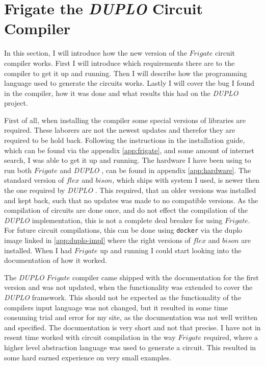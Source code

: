 \documentclass[twoside,11pt,openright]{report}
\newcommand{\DUPLO}{\textit{DUPLO} }
\begin{document}
\section{Frigate the \DUPLO Circuit Compiler}
\label{sec:frigate}
In this section, I will introduce how the new version of the $Frigate$ circuit compiler works. First I will introduce which requirements there are to the compiler to get it up and running. Then I will describe how the programming language used to generate the circuits works. Lastly I will cover the bug I found in the compiler, how it was done and what results this had on the \DUPLO project.

First of all, when installing the compiler some special versions of libraries are required. These laborers are not the newest updates and therefor they are required to be hold back. Following the instructions in the installation guide, which can be found via the appendix \ref{app:frigate}, and some amount of internet search, I was able to get it up and running. The hardware I have been using to run both $Frigate$ and \DUPLO, can be found in appendix \ref{app:hardware}. The standard version of $flex$ and $bison$, which ships with system I used, is newer then the one required by \DUPLO. This required, that an older versions was installed and kept back, such that no updates was made to no compatible versions. As the compilation of circuits are done once, and do not effect the compilation of the \DUPLO implementation, this is not a complete deal breaker for using $Frigate$. For future circuit compilations, this can be done using \verb|docker| via the duplo image linked in \ref{app:duplo-impl} where the right versions of $flex$ and $bison$ are installed. When I had $Frigate$ up and running I could start looking into the documentation of how it worked.

The \DUPLO $Frigate$ compiler came shipped with the documentation for the first version and was not updated, when the functionality was extended to cover the \DUPLO framework. This should not be expected as the functionality of the compilers input language was not changed, but it resulted in some time consuming trial and error for my site, as the documentation was not well written and specified. The documentation is very short and not that precise. I have not in resent time worked with circuit compilation in the way $Frigate$ required, where a higher level abstraction language was used to generate a circuit. This resulted in some hard earned experience on very small examples. 
\end{document}
